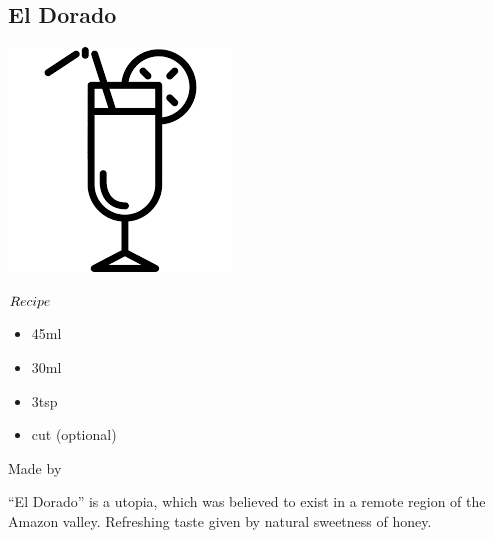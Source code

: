 \subsection{El Dorado}
\vspace{-7mm}
\hspace{35mm}
\includegraphics[scale=.07]{cocktail_glass_tall.png}
\vspace{2.5mm}
\begin{itembox}[l]{\boldmath $Recipe$}
\begin{itemize}
\setlength{\parskip}{0cm}
\setlength{\itemsep}{0cm}
\item \teq 45ml
\item \lj 30ml
\item \honey 3tsp
\item \orange cut (optional)
\end{itemize}
\vspace{-4mm}
Made by \shake
\end{itembox}
``El Dorado'' is a utopia, which was believed to exist in a remote region of the Amazon valley.
Refreshing taste given by natural sweetness of honey.
